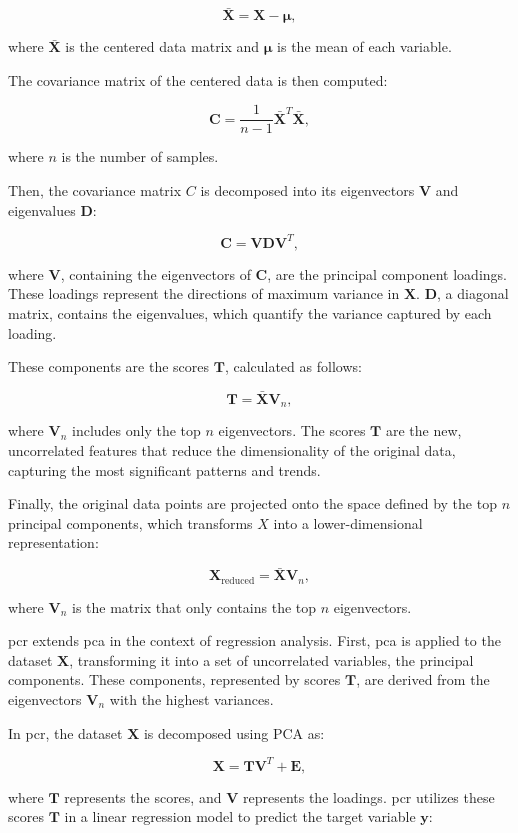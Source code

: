 $$
\mathbf{\bar{X}} = \mathbf{X} - \mathbf{\mu},
$$

where $\mathbf{\bar{X}}$ is the centered data matrix and $\mathbf{\mu}$ is the mean of each variable.

The covariance matrix of the centered data is then computed:

$$
\mathbf{C} = \frac{1}{n-1} \mathbf{\bar{X}}^T \mathbf{\bar{X}},
$$

where $n$ is the number of samples.

Then, the covariance matrix $C$ is decomposed into its eigenvectors $\mathbf{V}$ and eigenvalues $\mathbf{D}$:

$$
\mathbf{C} = \mathbf{V} \mathbf{D} \mathbf{V}^T,
$$

where $\mathbf{V}$, containing the eigenvectors of $\mathbf{C}$, are the principal component loadings.
These loadings represent the directions of maximum variance in $\mathbf{X}$.
$\mathbf{D}$, a diagonal matrix, contains the eigenvalues, which quantify the variance captured by each loading.

These components are the scores $\mathbf{T}$, calculated as follows:

$$
\mathbf{T} = \mathbf{\bar{X}} \mathbf{V}_n,
$$

where $\mathbf{V}_n$ includes only the top $n$ eigenvectors.
The scores $\mathbf{T}$ are the new, uncorrelated features that reduce the dimensionality of the original data, capturing the most significant patterns and trends.

Finally, the original data points are projected onto the space defined by the top $n$ principal components, which transforms $X$ into a lower-dimensional representation:

$$
\mathbf{X}_{\text{reduced}} = \mathbf{\bar{X}} \mathbf{V}_n,
$$

where $\mathbf{V}_n$ is the matrix that only contains the top $n$ eigenvectors.

\gls{pcr} extends \gls{pca} in the context of regression analysis.
First, \gls{pca} is applied to the dataset $\mathbf{X}$, transforming it into a set of uncorrelated variables, the principal components.
These components, represented by scores $\mathbf{T}$, are derived from the eigenvectors $\mathbf{V}_n$ with the highest variances.

In \gls{pcr}, the dataset $\mathbf{X}$ is decomposed using PCA as:

$$
\mathbf{X} = \mathbf{TV}^T + \mathbf{E},
$$

where $\mathbf{T}$ represents the scores, and $\mathbf{V}$ represents the loadings.
\gls{pcr} utilizes these scores $\mathbf{T}$ in a linear regression model to predict the target variable $\mathbf{y}$:

